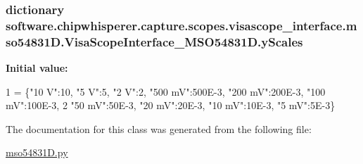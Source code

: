 \subsubsection[{y\+Scales}]{\setlength{\rightskip}{0pt plus 5cm}dictionary software.\+chipwhisperer.\+capture.\+scopes.\+visascope\+\_\+interface.\+mso54831\+D.\+Visa\+Scope\+Interface\+\_\+\+M\+S\+O54831\+D.\+y\+Scales\hspace{0.3cm}{\ttfamily [static]}}\label{classsoftware_1_1chipwhisperer_1_1capture_1_1scopes_1_1visascope__interface_1_1mso54831D_1_1VisaScopeInterface__MSO54831D_a32af1468fecc619a8b947fa2161c33ff}
{\bfseries Initial value\+:}
\begin{DoxyCode}
1 = \{\textcolor{stringliteral}{"10 V"}:10, \textcolor{stringliteral}{"5 V"}:5, \textcolor{stringliteral}{"2 V"}:2, \textcolor{stringliteral}{"500 mV"}:500E-3, \textcolor{stringliteral}{"200 mV"}:200E-3, \textcolor{stringliteral}{"100 mV"}:100E-3,
2                \textcolor{stringliteral}{"50 mV"}:50E-3, \textcolor{stringliteral}{"20 mV"}:20E-3, \textcolor{stringliteral}{"10 mV"}:10E-3, \textcolor{stringliteral}{"5 mV"}:5E-3\}
\end{DoxyCode}


The documentation for this class was generated from the following file\+:\begin{DoxyCompactItemize}
\item 
\hyperlink{mso54831D_8py}{mso54831\+D.\+py}\end{DoxyCompactItemize}
